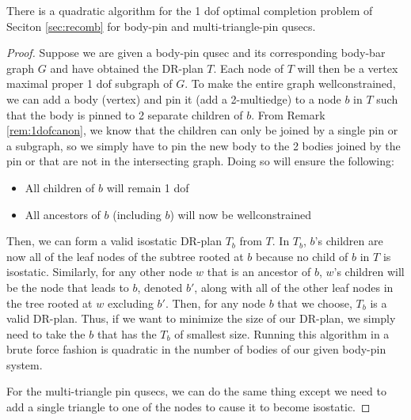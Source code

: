 \begin{figure}
\end{figure}

\begin{theorem}
    There is a quadratic algorithm for the 1 dof optimal completion problem of Seciton \ref{sec:recomb} for body-pin and multi-triangle-pin qusecs.
\end{theorem}

\begin{proof}
    Suppose we are given a body-pin qusec and its corresponding body-bar graph $G$ and have obtained the DR-plan $T$. Each node of $T$ will then be a vertex maximal proper 1 dof subgraph of $G$. To make the entire graph wellconstrained, we can add a body (vertex) and pin it (add a 2-multiedge) to a node $b$ in $T$ such that the body is pinned to 2 separate children of $b$. From Remark \ref{rem:1dofcanon}, we know that the children can only be joined by a single pin or a subgraph, so we simply have to pin the new body to the 2 bodies joined by the pin or that are not in the intersecting graph. Doing so will ensure the following:

    \begin{itemize}
        \item All children of $b$ will remain 1 dof
        \item All ancestors of $b$ (including $b$) will now be wellconstrained
    \end{itemize}

    Then, we can form a valid isostatic DR-plan $T_b$ from $T$. In $T_b$, $b$'s children are now all of the leaf nodes of the subtree rooted at $b$ because no child of $b$ in $T$ is isostatic. Similarly, for any other node $w$ that is an ancestor of $b$, $w$'s children will be the node that leads to $b$, denoted $b'$, along with all of the other leaf nodes in the tree rooted at $w$ excluding $b'$. Then, for any node $b$ that we choose, $T_b$ is a valid DR-plan. Thus, if we want to minimize the size of our DR-plan, we simply need to take the $b$ that has the $T_b$ of smallest size. Running this algorithm in a brute force fashion is quadratic in the number of bodies of our given body-pin system.

    For the multi-triangle pin qusecs, we can do the same thing except we need to add a single triangle to one of the nodes to cause it to become isostatic.

\end{proof}

